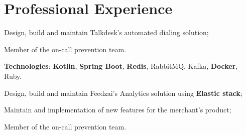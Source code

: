 \documentclass[letterpaper]{deedy-resume} %
\begin{document}
%
\begin{minipage}[t]{0.64\textwidth} %


\section{Professional Experience}
\vspace{0.5mm}

\vspace{4.0mm}
\begin{tightitemize}
	\item Design, build and maintain Talkdesk's automated dialing solution;
	\item Member of the on-call prevention team.
\end{tightitemize}

\vspace{0.75mm}

\textbf{Technologies}: \textbf{Kotlin}, \textbf{Spring Boot}, \textbf{Redis}, RabbitMQ, Kafka, \textbf{Docker}, Ruby.


\vspace{4.5mm}



\vspace{0.5mm}
\begin{tightitemize}
	\item Design, build and maintain Feedzai's Analytics solution using \textbf{Elastic stack};
	\item Maintain and implementation of new features for the merchant's product;
	\item Member of the on-call prevention team.
\end{tightitemize}


\end{minipage}
\end{document}
